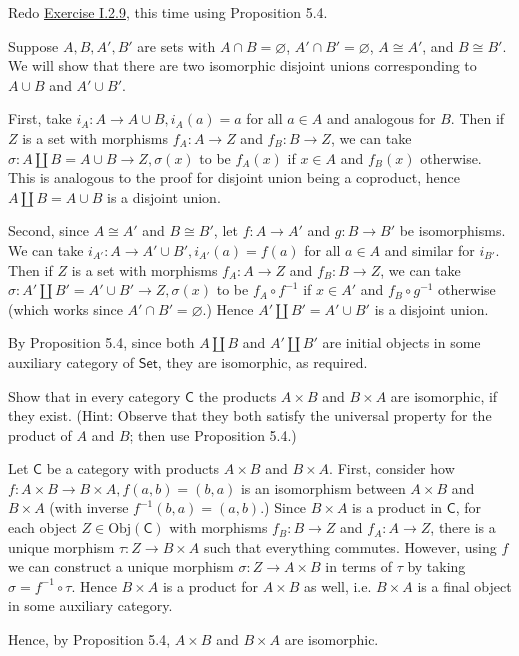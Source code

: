 \documentclass[12pt,letterpaper,boxed]{hmcpset}
\newcommand{\Obj}{\mathrm{Obj}}
\newcommand{\Set}{\mathsf{Set}}
\begin{document}
\begin{problem}[5.7]
	Redo \hyperlink{Exercise I.2.9}{Exercise I.2.9}, this time using Proposition 5.4.
\end{problem}
\begin{solution}
	Suppose $A,B,A',B'$ are sets with $A\cap B=\varnothing$, $A'\cap B'=\varnothing$,
	$A\cong A'$, and $B\cong B'$. We will show that there are two isomorphic
	disjoint unions corresponding to $A\cup B$ and $A'\cup B'$.
	
	First, take $i_A:A\to A\cup B, i_A(a) = a$ for all $a\in A$ and analogous for
	$B$. Then if $Z$ is a set with morphisms $f_A:A\to Z$ and $f_B:B\to Z$, we can
	take $\sigma:A\amalg B=A\cup B\to Z, \sigma(x)$ to be $f_A(x)$ if $x\in A$ and
	$f_B(x)$ otherwise. This is analogous to the proof for disjoint union being a
	coproduct, hence $A\amalg B=A\cup B$ is a disjoint union.
	
	Second, since $A\cong A'$ and $B\cong B'$, let $f:A\to A'$ and $g:B\to B'$ be
	isomorphisms. We can take $i_{A'}: A\to A'\cup B',i_{A'}(a) = f(a)$ for all
	$a\in A$ and similar for $i_{B'}$. Then if $Z$ is a set with morphisms $f_A:A\to
	Z$ and $f_B:B\to Z$, we can take $\sigma:A'\amalg B'=A'\cup B'\to Z, \sigma(x)$
	to be $f_A\circ f^{-1}$ if $x\in A'$ and $f_B\circ g^{-1}$ otherwise (which
	works since $A'\cap B'=\varnothing$.) Hence $A'\amalg B'=A'\cup B'$ is a disjoint
	union.
	
	By Proposition 5.4, since both $A\amalg B$ and $A'\amalg B'$ are initial objects
	in some auxiliary category of $\Set$, they are isomorphic, as required.
\end{solution}


\begin{problem}[5.8]
	Show that in every category $\mathsf{C}$ the products $A\times B$ and $B\times A$ are
	isomorphic, if they exist. (Hint: Observe that they both satisfy the universal
	property for the product of $A$ and $B$; then use Proposition 5.4.)
\end{problem}
\begin{solution}
	Let $\mathsf{C}$ be a category with products $A\times B$ and $B\times A$. First,
	consider how $f:A\times B\to B\times A, f(a,b) = (b,a)$ is an isomorphism
	between $A\times B$ and $B\times A$ (with inverse $f^{-1}(b,a) = (a,b)$.) Since
	$B\times A$ is a product in $\mathsf{C}$, for each object $Z\in\Obj(\mathsf{C})$ with morphisms
	$f_B:B\to Z$ and $f_A:A\to Z$, there is a unique morphism $\tau:Z\to B\times A$
	such that everything commutes. However, using $f$ we can construct a unique
	morphism $\sigma:Z\to A\times B$ in terms of $\tau$ by taking $\sigma =
	f^{-1}\circ\tau$. Hence $B\times A$ is a product for $A\times B$ as well, i.e.
	$B\times A$ is a final object in some auxiliary category.
	
	Hence, by Proposition 5.4, $A\times B$ and $B\times A$ are isomorphic.
\end{solution}
\end{document}
